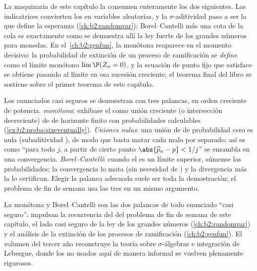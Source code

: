 \begin{remark}
La maquinaria de este capítulo la consumen enteramente los dos
siguientes. Las indicatrices convierten los  en variables
aleatorias, y la $\sigma$-aditividad pasa a ser la  que
define la esperanza (\cref{ch:b2:randomvar}); Borel--Cantelli más una
cota  de la cola es exactamente como se demuestra allí la ley
fuerte de los grandes números para monedas. En el~\cref{ch:b2:genfun}, la  monótona reaparece en el momento
decisivo: la probabilidad de extinción de un proceso de ramificación
se \emph{define} como el límite monótono $\lim\P(Z_n = 0)$, y la
ecuación de punto fijo que satisface se obtiene pasando al límite en
esa sucesión creciente; el teorema final del libro se sostiene sobre
el primer teorema de este capítulo.
\end{remark}

\begin{remark}
Los enunciados casi seguros se demuestran con tres palancas, en orden
creciente de potencia. \emph{ monótona}: exhíbase el
 como unión creciente (o intersección decreciente) de 
de horizonte finito con probabilidades calculables
(\cref{ex:b2:proba:sixeventually}). \emph{Uniones nulas}: una unión
 de  de probabilidad cero es nula (subaditividad
), de modo que basta matar cada  malo por separado;
así es como ``para todo $j$, a partir de cierto punto $\abs{\widehat
p_n - p} < 1/j$'' se ensambla en una convergencia.
\emph{Borel--Cantelli}: cuando el  es un límite superior, súmense
las probabilidades; la convergencia lo mata (sin necesidad de
) y la divergencia más la  lo certifican.
Elegir la palanca adecuada suele ser toda la demostración; el
problema de fin de semana usa las tres en un mismo argumento.
\end{remark}

\begin{remark}
La  monótona y Borel--Cantelli son las dos palancas de
todo enunciado ``casi seguro'': impulsan la recurrencia del
 del problema de fin de semana de este capítulo, el
lado casi seguro de la ley de los grandes números
(\cref{ch:b2:randomvar}) y el análisis de la extinción de los
procesos de ramificación (\cref{ch:b2:genfun}). El volumen del tercer
año reconstruye la teoría sobre $\sigma$-álgebras e integración de
Lebesgue, donde los  no  usados aquí de
manera informal se vuelven plenamente rigurosos.
\end{remark}

